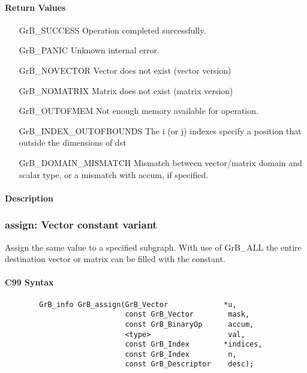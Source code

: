 \paragraph{Return Values}

\begin{itemize}[leftmargin=2.1in]
\item[{\sf GrB\_SUCCESS}]             Operation completed successfully.
\item[{\sf GrB\_PANIC}]               Unknown internal error.
\item[{\sf GrB\_NOVECTOR}]            Vector does not exist (vector version)
\item[{\sf GrB\_NOMATRIX}]            Matrix does not exist (matrix version)
\item[{\sf GrB\_OUTOFMEM}]            Not enough memory available for operation.
\item[{\sf GrB\_INDEX\_OUTOFBOUNDS}]  The i (or j) indexes specify a position that outside the dimensions of dst
\item[{\sf GrB\_DOMAIN\_MISMATCH}]    Mismatch between vector/matrix domain and scalar type,
                                      or a mismatch with {\sf accum}, if specified.
\end{itemize}

\paragraph{Description}

\subsubsection{{\sf assign}: Vector constant variant}

Assign the same value to a specified subgraph.  With use of {\sf GrB\_ALL} the entire
destination vector or matrix can be filled with the constant.


\paragraph{C99 Syntax}

\begin{verbatim}
        GrB_info GrB_assign(GrB_Vector             *u,
                            const GrB_Vector        mask,
                            const GrB_BinaryOp      accum,
                            <type>                  val,
                            const GrB_Index        *indices,
                            const GrB_Index         n,
                            const GrB_Descriptor    desc);
\end{verbatim}

